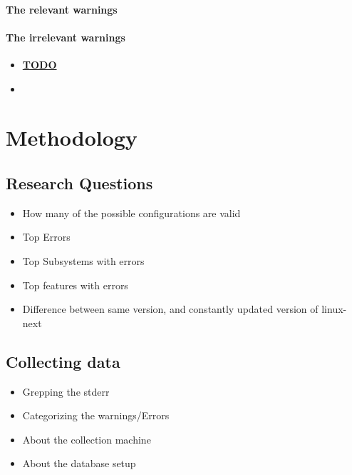 \documentclass[a4paper,11pt]{article}
\begin{document}
\paragraph{The relevant warnings}



\paragraph{The irrelevant warnings}





\begin{itemize}
    \item \underline{\textbf{TODO}}
    \item 
\end{itemize}


\newpage
\section{Methodology}

\subsection{Research Questions}

\begin{itemize}
    \item How many of the possible configurations are valid
    \item Top Errors
    \item Top Subsystems with errors
    \item Top features with errors
    \item Difference between same version, and constantly updated version of 
        linux-next
\end{itemize}

\subsection{Collecting data}

\begin{itemize}
    \item Grepping the stderr
    \item Categorizing the warnings/Errors
    \item About the collection machine
    \item About the database setup
\end{itemize}
\end{document}
